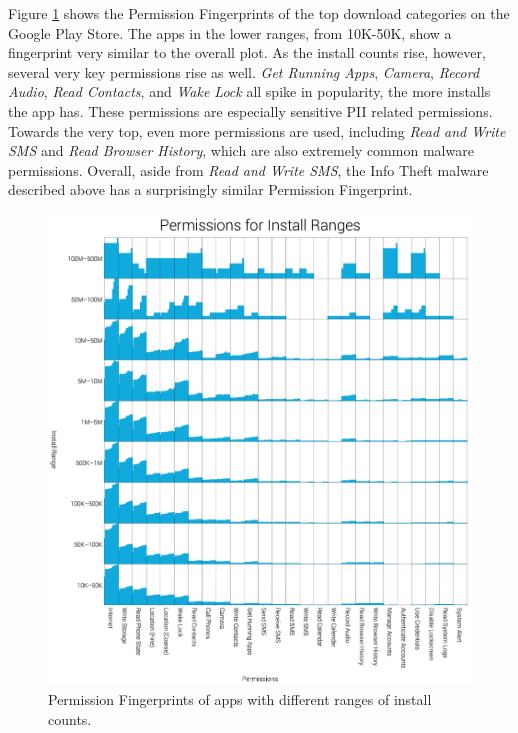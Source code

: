 

Figure \ref{fig:topappsfingerprint} shows the Permission Fingerprints of the top download categories on the Google Play Store. The apps in the lower ranges, from 10K-50K, show a fingerprint very similar to the overall plot. As the install counts rise, however, several very key permissions rise as well. \textit{Get Running Apps}, \textit{Camera}, \textit{Record Audio}, \textit{Read Contacts}, and \textit{Wake Lock} all spike in popularity, the more installs the app has. These permissions are especially sensitive PII related permissions. Towards the very top, even more permissions are used, including \textit{Read and Write SMS} and \textit{Read Browser History}, which are also extremely common malware permissions. Overall, aside from \textit{Read and Write SMS}, the Info Theft malware described above has a surprisingly similar Permission Fingerprint.

\begin{figure}[h]
\begin{center}
\includegraphics[width=1.0\columnwidth]{figs/PermissionsforInstallRanges}
\caption{Permission Fingerprints of apps with different ranges of install counts.}
\label{fig:topappsfingerprint}
\end{center}
\end{figure}



